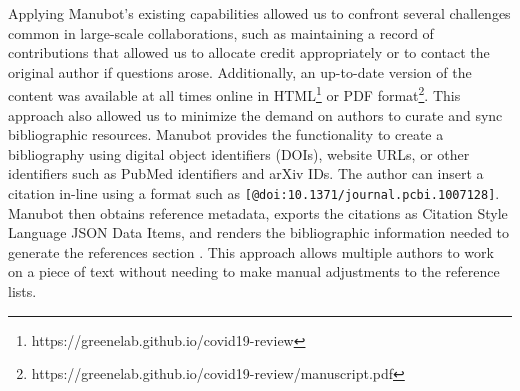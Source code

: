 \documentclass[twocolumn]{ceurart}
\begin{document}
Applying Manubot's existing capabilities allowed us to confront several challenges common in large-scale collaborations, such as maintaining a record of contributions that allowed us to allocate credit appropriately or to contact the original author if questions arose.
Additionally, an up-to-date version of the content was available at all times online in HTML\footnote{https://greenelab.github.io/covid19-review} or PDF format\footnote{https://greenelab.github.io/covid19-review/manuscript.pdf}.
This approach also allowed us to minimize the demand on authors to curate and sync bibliographic resources.
Manubot provides the functionality to create a bibliography using digital object identifiers (DOIs), website URLs, or other identifiers such as PubMed identifiers and arXiv IDs.
The author can insert a citation in-line using a format such as \texttt{{[}@doi:10.1371/journal.pcbi.1007128{]}}.
Manubot then obtains reference metadata, exports the citations as Citation Style Language JSON Data Items, and renders the bibliographic information needed to generate the references section \citep{YuJbg3zO}.
This approach allows multiple authors to work on a piece of text without needing to make manual adjustments to the reference lists.
\end{document}
